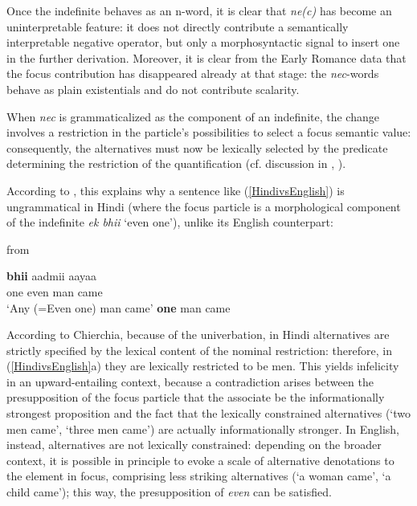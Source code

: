 \documentclass[output=paper,modfonts,nonflat,citecolor=brown,
showindex
]{langsci/langscibook}
\begin{document}
Once the indefinite behaves as an n-word, it is clear that {\emph{ne(c)}} has become an uninterpretable feature: it does not directly contribute a semantically interpretable negative operator, but only a morphosyntactic signal to insert one in the further derivation. Moreover, it is clear from the Early Romance data that the focus contribution has disappeared already at that stage: the {\emph{nec}}-words behave as plain existentials and do not contribute scalarity.

When {\emph{nec}} is grammaticalized as the component of an indefinite, the change involves a restriction in the particle's possibilities to select a focus semantic value: consequently, the alternatives must now be lexically selected by the predicate determining the restriction of the quantification (cf. discussion in \citealt[]{Lahiri98}, \citealt[]{Chierchia13}).

According to \citet[156--157]{Chierchia13}, this explains why a sentence like (\ref{HindivsEnglish}) is ungrammatical in Hindi (where the focus particle is a morphological component of the indefinite {\emph{ek bhii}} `even one'), unlike its English counterpart:

{\begin{exe}
\ex \label{HindivsEnglish} from \citet[156--157]{Chierchia13}
\begin{xlist}
\ex {} {\textbf{bhii}} aadmii aayaa\\
one even man came\\
`Any (=Even one) man came'
 {\textbf{one}} man came
\end{xlist}
\end{exe}}

\noindent According to Chierchia, because of the univerbation, in Hindi alternatives are strictly specified by the lexical content of the nominal restriction: therefore, in (\ref{HindivsEnglish}a) they are lexically restricted to be men. This yields infelicity in an upward-entailing context, because a contradiction arises between the presupposition of the focus particle that the associate be the informationally strongest proposition and the fact that the lexically constrained alternatives (`two men came', `three men came') are actually informationally stronger. In English, instead, alternatives are not lexically constrained: depending on the broader context, it is possible in principle to evoke a scale of alternative denotations to the element in focus, comprising less striking alternatives (`a woman came', `a child came'); this way, the presupposition of {\emph{even}} can be satisfied.
\end{document}
